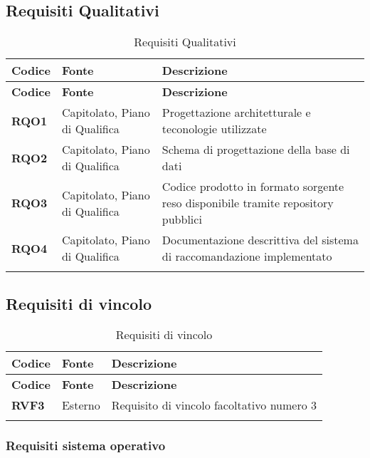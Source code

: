 \subsection{Requisiti Qualitativi}
\begin{longtable}{|>{\centering\arraybackslash}m{}|>{\centering\arraybackslash}m{}|>{\centering\arraybackslash}m{}|}
	\hline
	\textbf{Codice} & \textbf{Fonte} & \textbf{Descrizione}\\\hline
	\endfirsthead
	\hline
	\textbf{Codice} & \textbf{Fonte} & \textbf{Descrizione}\\\hline
	\endhead
	\hline
	\textbf{RQO1} & Capitolato, Piano di Qualifica & Progettazione architetturale e teconologie utilizzate \\
	\hline
	\textbf{RQO2} & Capitolato, Piano di Qualifica & Schema di progettazione della base di dati \\
	\hline
	\textbf{RQO3} & Capitolato, Piano di Qualifica & Codice prodotto in formato sorgente reso disponibile tramite repository pubblici \\
	\hline
	\textbf{RQO4} & Capitolato, Piano di Qualifica & Documentazione descrittiva del sistema di raccomandazione implementato\\
	\hline
	\caption{Requisiti Qualitativi}
\end{longtable}

\pagebreak
\subsection{Requisiti di vincolo}
\begin{longtable}{|>{\centering\arraybackslash}m{}|>{\centering\arraybackslash}m{}|>{\centering\arraybackslash}m{}|}
	\hline
	\textbf{Codice} & \textbf{Fonte} & \textbf{Descrizione}\\\hline
	\endfirsthead
	\hline
	\textbf{Codice} & \textbf{Fonte} & \textbf{Descrizione}\\\hline
	\endhead
	\hline
	\textbf{RVF3}            & Esterno    & Requisito di vincolo facoltativo numero 3
	\\\hline
	\caption{Requisiti di vincolo}
\end{longtable}

\subsubsection{Requisiti sistema operativo}

